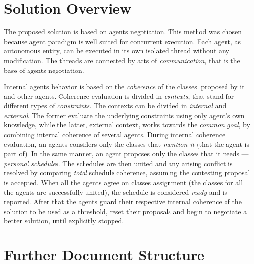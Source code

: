 \documentclass[header]{subfiles}
\begin{document}
\section{Solution Overview}
The proposed solution is based on \underline{agents negotiation}.
This method was chosen because agent paradigm is well suited for concurrent
execution. Each agent, as autonomous entity, can be executed in its own
isolated thread without any modification. The threads are connected by acts of
\emph{communication}, that is the base of agents negotiation.

Internal agents behavior is based on the \emph{coherence} of the classes,
proposed by it and other agents. Coherence evaluation is divided in \emph{contexts},
that stand for different types of \emph{constraints}. The contexts can be divided
in \emph{internal} and \emph{external}. The former evaluate the underlying
constraints using only agent's own knowledge, while the latter, external context,
works towards the \emph{common goal}, by combining internal coherence of several
agents.
During internal coherence evaluation, an agents considers only the
classes that \emph{mention it} (that the agent is part of). In the same manner,
an agent proposes only the classes that it needs --- \emph{personal schedules}.
The schedules are then united and any arising conflict is resolved by comparing
\emph{total} schedule coherence, assuming the contesting proposal is accepted.
When all the agents agree on classes assignment (the classes for all the agents
are successfully united), the schedule is considered \emph{ready} and is reported.
After that the agents guard their respective internal coherence of the solution
to be used as a threshold, reset their proposals and begin to negotiate a better
solution, until explicitly stopped.


\section{Further Document Structure}

\def\inChapter#1{In chapter \ref{chapter:#1}}
\def\showChapter#1{Chapter \ref{chapter:#1}}
\end{document}
